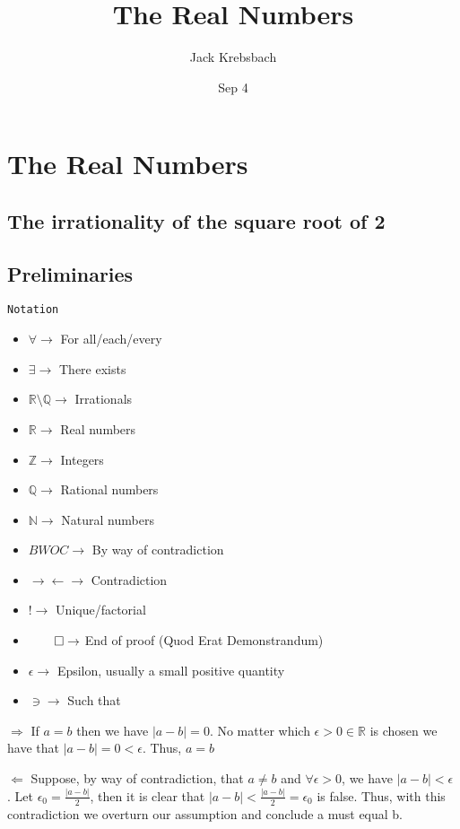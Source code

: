 \documentclass{report}
\title{The Real Numbers}
\author{Jack Krebsbach }
\date{Sep 4}
\begin{document}
\maketitle

\section{The Real Numbers}

\subsection{The irrationality of the square root of 2 }

\subsection{Preliminaries}

\texttt{Notation}
\begin{multicols}{2}
\begin{itemize}
  \item $\forall \rightarrow$ For all/each/every
  \item $\exists \rightarrow$ There exists
  \item $\mathbb{R} \setminus \mathbb{Q} \rightarrow$ Irrationals
  \item $\mathbb{R} \rightarrow$ Real numbers
  \item $\mathbb{Z} \rightarrow$ Integers
  \item $\mathbb{Q} \rightarrow$ Rational numbers
  \item $\mathbb{N} \rightarrow$ Natural numbers
  \item $BWOC \rightarrow$ By way of contradiction
  \item $\rightarrow\!\leftarrow \rightarrow$ Contradiction
  \item $! \rightarrow$ Unique/factorial
  \item $\qed \rightarrow$ End of proof (Quod Erat Demonstrandum)
  \item $\epsilon \rightarrow$ Epsilon, usually a small positive quantity
  \item $\ni \rightarrow$ Such that
\end{itemize}
\end{multicols}


\begin{myproof}

  \par
  $\Rightarrow$
  If $a=b$ then we have $|a-b| =0$. No matter which  $\epsilon >  0 \in \mathbb{R}$ is chosen we have that  $|a-b|=0 < \epsilon.$ Thus, $a=b$  \par
$\Leftarrow$
Suppose, by way of contradiction, that $a\neq b$ and $\forall \epsilon > 0$, we have $|a-b| < \epsilon$ . Let $\epsilon_{0} = \frac{|a-b|}{2}$, then it is clear that $|a-b| < \frac{|a-b|}{2} = \epsilon_{0}$ is false. Thus, with this contradiction we overturn our assumption and conclude a must equal b.
\end{myproof}
\end{document}
